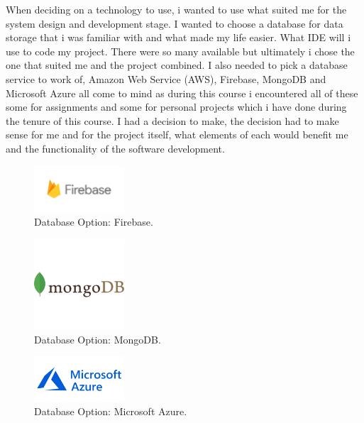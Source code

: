 When deciding on a technology to use, i wanted to use what suited me for the system design and development stage. I wanted to choose a database for data storage that i was familiar with and what made my life easier. What IDE will i use to code my project. There were so many available but ultimately i chose the one that suited me and the project combined. I also needed to pick a database service to work of, Amazon Web Service (AWS), Firebase, MongoDB and Microsoft Azure all come to mind as during this course i encountered all of these some for assignments and some for personal projects which i have done during the tenure of this course. I had a decision to make, the decision had to make sense for me and for the project itself, what elements of each would benefit me and the functionality of the software development.
\newline

\begin{figure}[h!]
	\caption{Database Option: Firebase.}
	\label{image:firebase}
	\centering
	\includegraphics[width=0.3\textwidth]{images/firebase.png}
\end{figure}

\begin{figure}[h!]
	\caption{Database Option: MongoDB.}
	\label{image:mongodb}
	\centering
	\includegraphics[width=0.3\textwidth]{images/mongodb.png}
\end{figure}

\newpage

\begin{figure}[h!]
	\caption{Database Option: Microsoft Azure.}
	\label{image:azure}
	\centering
	\includegraphics[width=0.3\textwidth]{images/azure.png}
\end{figure}

